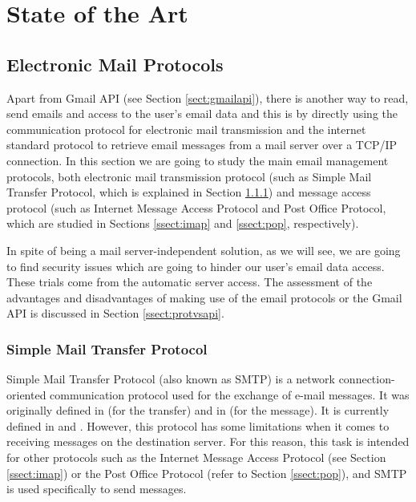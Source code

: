 \chapter{State of the Art}
\label{cap:estadoDeLaCuestion}



\section{Electronic Mail Protocols}
Apart from Gmail API (see Section \ref{sect:gmailapi}), there is another way to read, send emails and access to the user's email data and this is by directly using the communication protocol for electronic mail transmission and the internet standard protocol to retrieve email messages from a mail server over a TCP/IP connection. In this section we are going to study the main email management protocols, both electronic mail transmission protocol (such as Simple Mail Transfer Protocol, which is explained in Section \ref{ssect:smtp}) and message access protocol (such as Internet Message Access Protocol and Post Office Protocol, which are studied in Sections \ref{ssect:imap} and \ref{ssect:pop}, respectively).

In spite of being a mail server-independent solution, as we will see, we are going to find security issues which are going to hinder our user's email data access. These trials come from the automatic server access. The assessment of the advantages and disadvantages of making use of the email protocols or the Gmail API is discussed in Section \ref{ssect:protvsapi}.

\subsection{Simple Mail Transfer Protocol} \label{ssect:smtp}

Simple Mail Transfer Protocol (also known as SMTP) is a network connection-oriented communication protocol used for the exchange of e-mail messages. It was originally defined in \cite{rfc821} (for the transfer) and in \cite{rfc822} (for the message). It is currently defined in \cite{rfc5321} and \cite{rfc5322}. However, this protocol has some limitations when it comes to receiving messages on the destination server. For this reason, this task is intended for other protocols such as the Internet Message Access Protocol (see Section \ref{ssect:imap}) or the Post Office Protocol (refer to Section \ref{ssect:pop}), and SMTP is used specifically to send messages.

